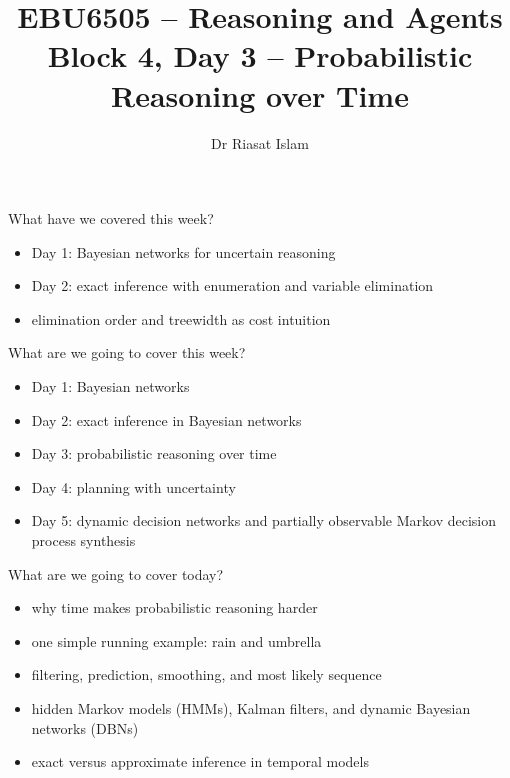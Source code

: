 \documentclass[aspectratio=169]{beamer}
\title[EBU6505 B4 D3]{EBU6505 -- Reasoning and Agents\\Block 4, Day 3 -- Probabilistic Reasoning over Time}
\author{Dr Riasat Islam}
\institute{Queen Mary University of London}
\date{}
\newcommand{\defaultdeckrefs}{AIMA4e Ch.14 pp.461--499; Poole3e Ch.9 pp.375--458}
\newcommand{\currentsliderefs}{\defaultdeckrefs}
\newcommand{\setslideref}[1]{\gdef\currentsliderefs{#1}}
\begin{document}
\setslideref{AIMA4e Ch.14 pp.461--499; Poole3e Ch.9 pp.375--458}
\begin{frame}
  \titlepage
\end{frame}

\begin{frame}{What have we covered this week?}
\begin{itemize}
  \item Day 1: Bayesian networks for uncertain reasoning
  \item Day 2: exact inference with enumeration and variable elimination
  \item elimination order and treewidth as cost intuition
\end{itemize}
\end{frame}

\begin{frame}{What are we going to cover this week?}
\begin{itemize}
  \item Day 1: Bayesian networks
  \item Day 2: exact inference in Bayesian networks
  \item Day 3: probabilistic reasoning over time
  \item Day 4: planning with uncertainty
  \item Day 5: dynamic decision networks and partially observable Markov decision process synthesis
\end{itemize}
\end{frame}

\begin{frame}{What are we going to cover today?}
\begin{itemize}
  \item why time makes probabilistic reasoning harder
  \item one simple running example: rain and umbrella
  \item filtering, prediction, smoothing, and most likely sequence
  \item hidden Markov models (HMMs), Kalman filters, and dynamic Bayesian networks (DBNs)
  \item exact versus approximate inference in temporal models
\end{itemize}
\end{frame}
\end{document}
